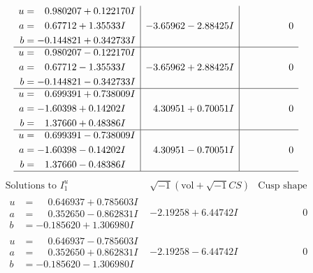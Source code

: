 \documentclass[1p]{elsarticle_modified}
\theoremstyle{definition}
\newcommand{\I}{\sqrt{-1}}
\begin{document}
$$\begin{array}{c|c|c}
\begin{aligned}
u &= \phantom{-}0.980207 + 0.122170 I \\
a &= \phantom{-}0.67712 + 1.35533 I \\
b &= -0.144821 + 0.342733 I\end{aligned}
 & -3.65962 - 2.88425 I & \phantom{-0.000000 } 0 \\ \hline\begin{aligned}
u &= \phantom{-}0.980207 - 0.122170 I \\
a &= \phantom{-}0.67712 - 1.35533 I \\
b &= -0.144821 - 0.342733 I\end{aligned}
 & -3.65962 + 2.88425 I & \phantom{-0.000000 } 0 \\ \hline\begin{aligned}
u &= \phantom{-}0.699391 + 0.738009 I \\
a &= -1.60398 + 0.14202 I \\
b &= \phantom{-}1.37660 + 0.48386 I\end{aligned}
 & \phantom{-}4.30951 + 0.70051 I & \phantom{-0.000000 } 0 \\ \hline\begin{aligned}
u &= \phantom{-}0.699391 - 0.738009 I \\
a &= -1.60398 - 0.14202 I \\
b &= \phantom{-}1.37660 - 0.48386 I\end{aligned}
 & \phantom{-}4.30951 - 0.70051 I & \phantom{-0.000000 } 0\\
 \hline 
 \end{array}$$\newpage$$\begin{array}{c|c|c}  
\text{Solutions to }I^u_{1}& \I (\text{vol} + \sqrt{-1}CS) & \text{Cusp shape}\\
 \hline 
\begin{aligned}
u &= \phantom{-}0.646937 + 0.785603 I \\
a &= \phantom{-}0.352650 - 0.862831 I \\
b &= -0.185620 + 1.306980 I\end{aligned}
 & -2.19258 + 6.44742 I & \phantom{-0.000000 } 0 \\ \hline\begin{aligned}
u &= \phantom{-}0.646937 - 0.785603 I \\
a &= \phantom{-}0.352650 + 0.862831 I \\
b &= -0.185620 - 1.306980 I\end{aligned}
 & -2.19258 - 6.44742 I & \phantom{-0.000000 } 0 \\ \hline\begin{aligned}

\end{aligned}
\end{array}$$
\end{document}
